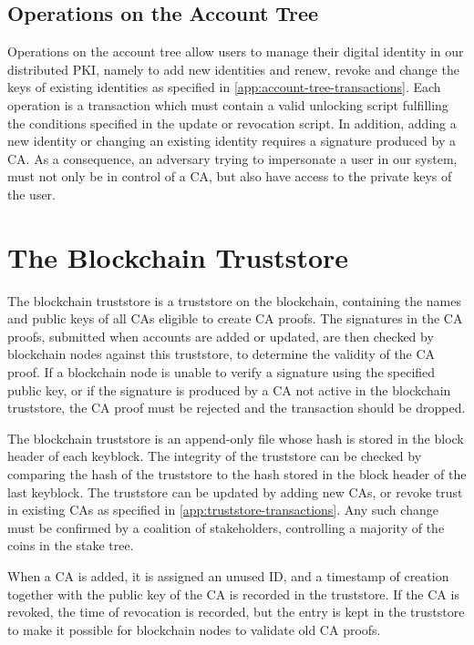 \documentclass{style/kththesis}
\begin{document}
\subsection{Operations on the Account Tree}
Operations on the account tree allow users to manage their digital identity in our distributed PKI, namely to add new identities and renew, revoke and change the keys of existing identities as specified in \cref{app:account-tree-transactions}. Each operation is a transaction which must contain a valid unlocking script fulfilling the conditions specified in the update or revocation script. In addition, adding a new identity or changing an existing identity requires a signature produced by a CA. As a consequence, an adversary trying to impersonate a user in our system, must not only be in control of a CA, but also have access to the private keys of the user.

\section{The Blockchain Truststore}
The blockchain truststore is a truststore on the blockchain, containing the names and public keys of all CAs eligible to create CA proofs. The signatures in the CA proofs, submitted when accounts are added or updated, are then checked by blockchain nodes against this truststore, to determine the validity of the CA proof. If a blockchain node is unable to verify a signature using the specified public key, or if the signature is produced by a CA not active in the blockchain truststore, the CA proof must be rejected and the transaction should be dropped.

The blockchain truststore is an append-only file whose hash is stored in the block header of each keyblock. The integrity of the truststore can be checked by comparing the hash of the truststore to the hash stored in the block header of the last keyblock. The truststore can be updated by adding new CAs, or revoke trust in existing CAs as specified in \cref{app:truststore-transactions}. Any such change must be confirmed by a coalition of stakeholders, controlling a majority of the coins in the stake tree.

When a CA is added, it is assigned an unused ID, and a timestamp of creation together with the public key of the CA is recorded in the truststore. If the CA is revoked, the time of revocation is recorded, but the entry is kept in the truststore to make it possible for blockchain nodes to validate old CA proofs.
\end{document}
